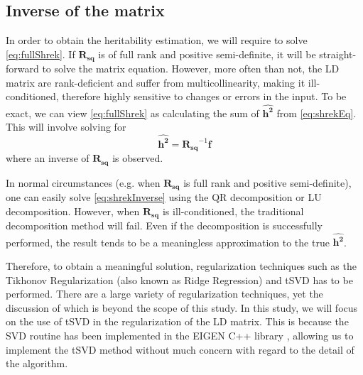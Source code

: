 \documentclass{book}
\begin{document}
		\subsection{Inverse of the  matrix}
			In order to obtain the heritability estimation, we will require to solve \cref{eq:fullShrek}. 
			If $\boldsymbol{R_{sq}}$ is of full rank and positive semi-definite, it will be straight-forward to solve the matrix equation.
			However, more often than not, the \gls{LD} matrix are rank-deficient and suffer from multicollinearity, making it ill-conditioned, therefore highly sensitive to changes or errors in the input.
			To be exact, we can view \cref{eq:fullShrek} as calculating the sum of $\boldsymbol{\hat{h^2}}$ from  \cref{eq:shrekEq}.
			This will involve solving for
			\begin{equation}
			\boldsymbol{\hat{h^2}} = \boldsymbol{R_{sq}}^{-1}\boldsymbol{f}
			\label{eq:shrekInverse}
			\end{equation}
			where an inverse of $\boldsymbol{R_{sq}}$ is observed. 
			
			In normal circumstances (e.g. when $\boldsymbol{R_{sq}}$ is full rank and positive semi-definite), one can easily solve \cref{eq:shrekInverse} using the QR decomposition or LU decomposition.
			However, when $\boldsymbol{R_{sq}}$ is ill-conditioned, the traditional decomposition method will fail.
			Even if the decomposition is successfully performed, the result tends to be a meaningless approximation to the true $\boldsymbol{\hat{h^2}}$. 
			
			Therefore, to obtain a meaningful solution, regularization techniques such as the Tikhonov Regularization (also known as Ridge Regression) and \gls{tSVD} has to be performed\parencite{Neumaier1998}. 
			There are a large variety of regularization techniques, yet the discussion of which is beyond the scope of this study. 
			In this study, we will focus on the use of \gls{tSVD} in the regularization of the \gls{LD} matrix.
			This is because the \gls{SVD} routine has been implemented in the EIGEN C++ library \parencite{eigenweb}, allowing us to implement the \gls{tSVD} method without much concern with regard to the detail of the algorithm. 
			
\end{document}
